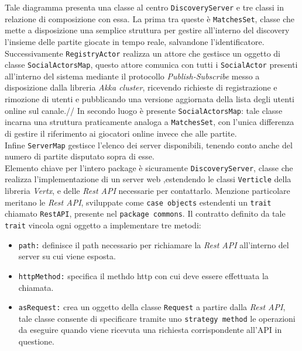 Tale diagramma presenta una classe al centro \texttt{DiscoveryServer} e tre classi in relazione di composizione con essa.
La prima tra queste è \texttt{MatchesSet}, classe che mette a disposizione una semplice struttura per gestire all'interno del discovery l'insieme delle partite giocate in tempo reale, salvandone l'identificatore.\\
Successivamente \texttt{RegistryActor} realizza un attore che gestisce un oggetto di classe \texttt{SocialActorsMap}, questo attore comunica con tutti i \texttt{SocialActor} presenti all'interno del sistema mediante il protocollo \textit{Publish-Subscribe} messo a disposizione dalla libreria \textit{Akka cluster}, ricevendo richieste di registrazione e rimozione di utenti e pubblicando una versione aggiornata della lista degli utenti online sul canale.//
In secondo luogo è presente \texttt{SocialActorsMap}: tale classe incarna una struttura praticamente analoga a \texttt{MatchesSet}, con l'unica differenza di gestire il riferimento ai giocatori online invece che alle partite.\\
Infine \texttt{ServerMap} gestisce l'elenco dei server disponibili, tenendo conto anche del numero di partite disputato sopra di esse.\\
Elemento chiave per l'intero package è sicuramente \texttt{DiscoveryServer}, classe che realizza l'implementazione di un server web ,estendendo le classi \texttt{Verticle} della libreria \textit{Vertx}, e delle \textit{Rest API} necessarie per contattarlo.
Menzione particolare meritano le \textit{Rest API}, sviluppate come \texttt{case objects} estendenti un \texttt{trait} chiamato \texttt{RestAPI}, presente nel \texttt{package commons}. Il contratto definito da tale \texttt{trait} vincola ogni oggetto a implementare tre metodi:
\begin{itemize}
  \item{\texttt{path:\/}} definisce il path necessario per richiamare la \textit{Rest API} all'interno del server su cui viene esposta.

  \item{\texttt{httpMethod:\/}} specifica il methdo http con cui deve essere effettuata la chiamata.

  \item{\texttt{asRequest:\/}} crea un oggetto della classe \texttt{Request} a partire dalla \textit{Rest API}, tale classe consente di specificare tramite uno \texttt{strategy method} le operazioni da eseguire quando viene ricevuta una richiesta corrispondente all'API in questione.
\end{itemize}

